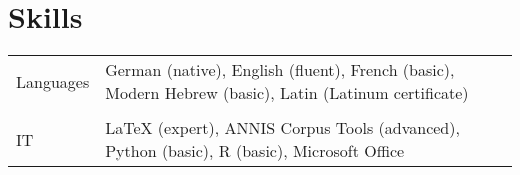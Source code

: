 \documentclass[11pt]{article}
\begin{document}
\section*{Skills}
\begin{flushleft}
	\begin{tabularx}{\textwidth}{@{}p{}>{\RaggedRight\arraybackslash}p{}@{}}
	Languages	& German (native), English (fluent), French (basic), Modern Hebrew (basic), Latin (Latinum certificate) \\
	& \\
	IT & LaTeX (expert), ANNIS Corpus Tools (advanced), Python (basic), R (basic), Microsoft Office\\
	\end{tabularx}
\end{flushleft}
	

\end{document}
